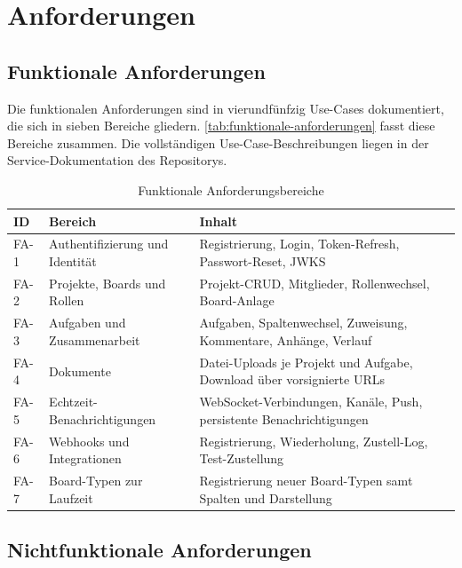 \section{Anforderungen}
\label{sec:anforderungen}

\subsection{Funktionale Anforderungen}
\label{subsec:funktionale-anforderungen}

Die funktionalen Anforderungen sind in vierundfünfzig Use-Cases dokumentiert, die sich in sieben Bereiche gliedern. \vref{tab:funktionale-anforderungen} fasst diese Bereiche zusammen. Die vollständigen Use-Case-Beschreibungen liegen in der Service-Dokumentation des Repositorys.

\begin{table}[ht]
  \centering
  \caption{Funktionale Anforderungsbereiche}
  \label{tab:funktionale-anforderungen}
  \begin{tabularx}{\linewidth}{@{}l>{\raggedright\arraybackslash}p{4.4cm}X@{}}
    \toprule
    \textbf{ID} & \textbf{Bereich} & \textbf{Inhalt} \\
    \midrule
    FA-1 & Authentifizierung und Identität & Registrierung, Login, Token-Refresh, Passwort-Reset, JWKS \\
    FA-2 & Projekte, Boards und Rollen     & Projekt-CRUD, Mitglieder, Rollenwechsel, Board-Anlage \\
    FA-3 & Aufgaben und Zusammenarbeit     & Aufgaben, Spaltenwechsel, Zuweisung, Kommentare, Anhänge, Verlauf \\
    FA-4 & Dokumente                       & Datei-Uploads je Projekt und Aufgabe, Download über vorsignierte URLs \\
    FA-5 & Echtzeit-Benachrichtigungen     & WebSocket-Verbindungen, Kanäle, Push, persistente Benachrichtigungen \\
    FA-6 & Webhooks und Integrationen      & Registrierung, Wiederholung, Zustell-Log, Test-Zustellung \\
    FA-7 & Board-Typen zur Laufzeit        & Registrierung neuer Board-Typen samt Spalten und Darstellung \\
    \bottomrule
  \end{tabularx}
\end{table}

\subsection{Nichtfunktionale Anforderungen}
\label{subsec:nichtfunktionale-anforderungen}

